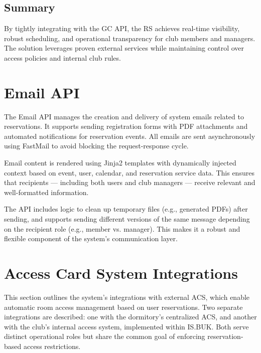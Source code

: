 \subsection{Summary}

By tightly integrating with the GC API, the RS achieves real-time visibility, robust scheduling, and operational transparency for club members and managers. The solution leverages proven external services while maintaining control over access policies and internal club rules.

\section{Email API}

The Email API manages the creation and delivery of system emails related to reservations. It supports sending registration forms with PDF attachments and automated notifications for reservation events. All emails are sent asynchronously using FastMail to avoid blocking the request-response cycle.

Email content is rendered using Jinja2 templates with dynamically injected context based on event, user, calendar, and reservation service data. This ensures that recipients — including both users and club managers — receive relevant and well-formatted information.

The API includes logic to clean up temporary files (e.g., generated PDFs) after sending, and supports sending different versions of the same message depending on the recipient role (e.g., member vs. manager). This makes it a robust and flexible component of the system’s communication layer.

\section{Access Card System Integrations}

This section outlines the system’s integrations with external ACS, which enable automatic room access management based on user reservations. Two separate integrations are described: one with the dormitory’s centralized ACS, and another with the club’s internal access system, implemented within IS.BUK. Both serve distinct operational roles but share the common goal of enforcing reservation-based access restrictions.

